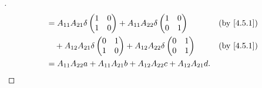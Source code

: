 \begin{proof}[]
\begin{align*}
                          & = A_{1 1} A_{2 1} \delta\begin{pmatrix}
                                                      1 & 0 \\
                                                      1 & 0
                                                    \end{pmatrix} + A_{1 1} A_{2 2} \delta\begin{pmatrix}
                                                                                            1 & 0 \\
                                                                                            0 & 1
                                                                                          \end{pmatrix}                            &  & \text{(by \cref{4.5.1})}       \\
                          & \quad + A_{1 2} A_{2 1} \delta\begin{pmatrix}
                                                            0 & 1 \\
                                                            1 & 0
                                                          \end{pmatrix} + A_{1 2} A_{2 2} \delta\begin{pmatrix}
                                                                                                  0 & 1 \\
                                                                                                  0 & 1
                                                                                                \end{pmatrix}                            &  & \text{(by \cref{4.5.1})} \\
                          & = A_{1 1} A_{2 2} a + A_{1 1} A_{2 1} b + A_{1 2} A_{2 2} c + A_{1 2} A_{2 1} d.
  \end{align*}
\end{proof}
